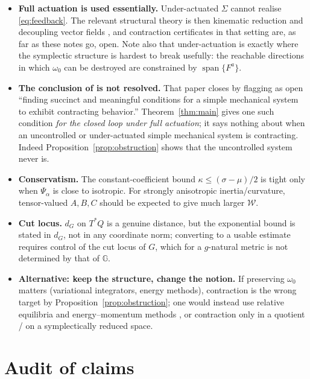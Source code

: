\documentclass[11pt,a4paper]{article}
\newcommand{\Gm}{\mathbb{G}}                      %
\newcommand{\Stiff}{\Psi}
\newcommand{\Tstar}{T^{*}Q}
\theoremstyle{plain}
\theoremstyle{definition}
\theoremstyle{remark}
\begin{document}
\begin{itemize}[leftmargin=1.6em,itemsep=3pt]
\item \textbf{Full actuation is used essentially.} Under-actuated $\Sigma$
      cannot realise \eqref{eq:feedback}. The relevant structural theory is then
      kinematic reduction and decoupling vector fields \cite[Ch.~8]{BL04}, and
      contraction certificates in that setting are, as far as these notes go,
      open. Note also that under-actuation is exactly where the symplectic
      structure is hardest to break usefully: the reachable directions in which
      $\omega_0$ can be destroyed are constrained by
      $\operatorname{span}\{F^a\}$.
\item \textbf{The conclusion of \cite{SB13} is not resolved.} That paper closes by
      flagging as open ``finding succinct and meaningful conditions for a simple
      mechanical system to exhibit contracting behavior.'' Theorem~\ref{thm:main}
      gives one such condition \emph{for the closed loop under full actuation};
      it says nothing about when an uncontrolled or under-actuated simple
      mechanical system is contracting. Indeed
      Proposition~\ref{prop:obstruction} shows that the uncontrolled system never
      is.
\item \textbf{Conservatism.} The constant-coefficient bound
      $\kappa \le (\sigma-\mu)/2$ is tight only when $\Stiff_\alpha$ is close to
      isotropic. For strongly anisotropic inertia/curvature, tensor-valued
      $A,B,C$ should be expected to give much larger $\mathcal{W}$.
\item \textbf{Cut locus.} $d_G$ on $\Tstar$ is a genuine distance, but the
      exponential bound is stated in $d_G$, not in any coordinate norm; converting
      to a usable estimate requires control of the cut locus of $G$, which for a
      $g$-natural metric is not determined by that of $\Gm$.
\item \textbf{Alternative: keep the structure, change the notion.} If preserving
      $\omega_0$ matters (variational integrators, energy methods), contraction is
      the wrong target by Proposition~\ref{prop:obstruction}; one would instead
      use relative equilibria and energy--momentum methods
      \cite[\S6.3]{BL04}, or contraction only in a quotient / on a
      symplectically reduced space.
\end{itemize}

\section{Audit of claims}
\label{sec:audit}
\end{document}
